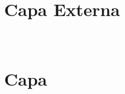 \documentclass[
  11pt,
  aspectratio=169,
  english,                    %
  french,                     %
  spanish,                    %
  brazil                      %
  ]{beamer}
\title[\disciplina]{\disciplina}
\subtitle[\curso]{\curso}
\author[SILVA JUNIOR, J. F. $\therefore$]{\href{\professorlattes}{\professor}}
\institute[UNINASSAU]{\texttt{[image: img/logo/logo.png]}}
\date{\data}
\begin{document}
\section*{Capa Externa}\label{sec:capa-externa}



{
  \begin{frame}[plain]

    ~

  \end{frame}
} %



\section*{Capa}\label{sec:capa}
\end{document}
